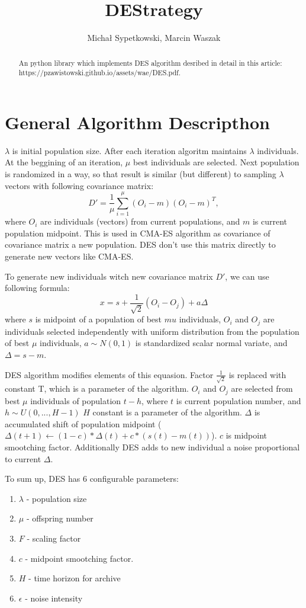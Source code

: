 \documentclass[11pt,a4paper]{article}
\title{DEStrategy}
\author{Michał Sypetkowski, Marcin Waszak}
\date{}
\begin{document}
\maketitle

\begin{abstract}
An python library which implements DES algorithm desribed in detail in this article: https://pzawistowski.github.io/assets/wae/DES.pdf.

\end{abstract}
\section{General Algorithm Descripthon}\label{sec:general}

$\lambda$ is initial population size.
After each iteration algoritm maintains $\lambda$ individuals.
At the beggining of an iteration, $\mu$ best individuals are selected.
Next population is randomized in a way, so that result is similar (but different) to sampling $\lambda$ vectors with following covariance matrix:
\begin{equation}
    D' = \frac{1}{\mu} \sum_{i=1}^{\mu} (O_i - m)(O_i - m)^T,
    \label{eqn:equa1}
\end{equation}
where $O_i$ are individuals (vectors) from current populations, and $m$ is current population midpoint.
This is used in CMA-ES algorithm as covariance of covariance matrix a new population.
DES don't use this matrix directly to generate new vectors like CMA-ES.

To generate new individuals witch new covariance matrix $D'$, we can use following formula:
\begin{equation}
    x = s + \frac{1}{\sqrt2}(O_i - O_j) + a\Delta
\end{equation}
where $s$ is midpoint of a population of best $mu$ individuals,
$O_i$ and $O_j$ are individuals selected independently with uniform distribution from the population of best $\mu$ individuals,
$a \sim N(0,1)$ is standardized scalar normal variate,
and $\Delta=s-m$.

DES algorithm modifies elements of this equasion.
Factor $\frac{1}{\sqrt2}$ is replaced with constant T, which is a parameter of the algorithm.
$O_i$ and $O_j$ are selected from best $\mu$ individuals of population $t-h$, where $t$ is current population number, and $h \sim U(0, ..., H-1)$
$H$ constant is a parameter of the algorithm.
$\Delta$ is accumulated shift of population midpoint
($\Delta(t+1) \leftarrow (1-c)*\Delta(t)+c*(s(t)-m(t))$).
$c$ is midpoint smootching factor.
Additionally DES adds to new individual a noise proportional to current $\Delta$.

To sum up, DES has 6 configurable parameters:
\begin{enumerate}
\item $\lambda$ - population size
\item $\mu$ - offspring number
\item $F$ - scaling factor
\item $c$ - midpoint smootching factor.
\item $H$ - time horizon for archive
\item $\epsilon$ - noise intensity
\end{enumerate}
\end{document}
